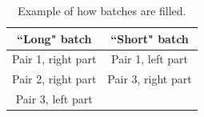 \begin{table}
	\centering
	\begin{tabular}{|c|c|}
		\hline 
		\textbf{``Long" batch} & \textbf{``Short" batch} \\ 
		\hline 
		Pair 1, right part & Pair 1, left part \\ 
		\hline 
		Pair 2, right part & Pair 3, right part \\ 
		\hline 
		Pair 3, left part &  \\ 
		\hline 
	\end{tabular} 
	\caption{Example of how batches are filled.}
	\label{tbl:batches}
\end{table}

